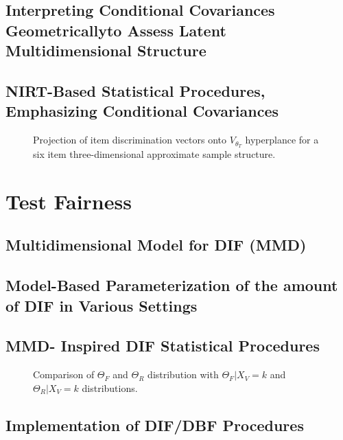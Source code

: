 \documentclass[titlepage,11pt,twoside]{article}
\begin{document}
\subsection{Interpreting Conditional Covariances Geometrically\break to Assess Latent Multidimensional Structure}


\subsection{NIRT-Based Statistical Procedures, Emphasizing Conditional Covariances}


\begin{figure}[h]
\caption{Projection of item discrimination vectors onto $V_{\theta_T}$ hyperplance for a six item three-dimensional approximate sample structure.}
\end{figure}



\section{Test Fairness}



\subsection{Multidimensional Model for DIF (MMD)}



\subsection{Model-Based Parameterization of the amount of DIF in Various Settings}



\subsection{MMD- Inspired DIF Statistical Procedures}



\begin{figure}[h]
\caption{Comparison of $\Theta_F$ and $\Theta_R $ distribution with $\Theta_F \vert X_V = k$ and $\Theta_R \vert X_V = k$ distributions.}
\end{figure}

\subsection{Implementation of DIF/DBF Procedures}
\end{document}
